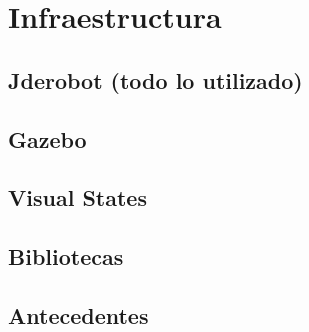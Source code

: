 \chapter{Infraestructura}\label{cap.infraestructura}
\section{Jderobot (todo lo utilizado)}
\section{Gazebo}
\section{Visual States}
\section{Bibliotecas}
\section{Antecedentes}